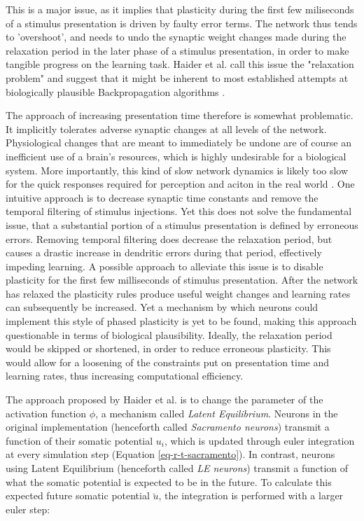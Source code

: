 This is a major issue, as it implies that plasticity during the first few miliseconds of a stimulus presentation is
driven by faulty error terms. The network thus tends to 'overshoot', and needs to undo the synaptic weight changes made
during the relaxation period in the later phase of a stimulus presentation, in order to make tangible progress on the
learning task. Haider et al. call this issue the "relaxation problem" and suggest that it might be inherent to most
established attempts at biologically plausible Backpropagation algorithms
\citep{Whittington2017,guerguiev2017towards,sacramento2018dendritic,millidge2020activation}.


The approach of increasing presentation time therefore is somewhat problematic. It implicitly tolerates adverse synaptic
changes at all levels of the network. Physiological changes that are meant to immediately be undone  are of course an
inefficient use of a brain's resources, which is highly undesirable for a biological system. More importantly, this kind
of slow network dynamics is likely too slow for the quick responses required for perception and aciton in the real world
\citep{Bartunov2018}. One intuitive approach is to decrease synaptic time constants and remove the temporal filtering of
stimulus injections. Yet this does not solve the fundamental issue, that a substantial portion of a stimulus
presentation is defined by erroneous errors. Removing temporal filtering does decrease the relaxation period, but causes
a drastic increase in dendritic errors during that period, effectively impeding learning. A possible approach to
alleviate this issue is to disable plasticity for the first few milliseconds of stimulus presentation. After the network
has relaxed the plasticity rules produce useful weight changes and learning rates can subsequently be increased. Yet a
mechanism by which neurons could implement this style of phased plasticity is yet to be found, making this approach
questionable in terms of biological plausibility. Ideally, the relaxation period would be skipped or shortened, in order
to reduce erroneous plasticity. This would allow for a loosening of the constraints put on presentation time and
learning rates, thus increasing computational efficiency. \newline

The approach proposed by Haider et al. is to change the parameter of the activation function $\phi$, a mechanism called
\textit{Latent Equilibrium}. Neurons in the original implementation (henceforth called \textit{Sacramento neurons})
transmit a function of their somatic potential $u_i$, which is updated through euler integration at every simulation
step (Equation \ref{eq-r-t-sacramento}). In contrast, neurons using Latent Equilibrium (henceforth called \textit{LE
neurons}) transmit a function of what the somatic potential is expected to be in the future. To calculate this expected
future somatic potential $\breve{u}$, the integration is performed with a larger euler step:

